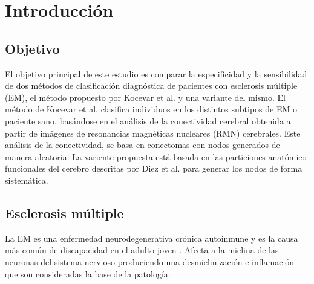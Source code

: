 \documentclass[fleqn,10pt]{UICArticle} %
\affiliation{\textsuperscript{1}\textit{Facultad de Medicina, Universitat Internacional de Catalunya, Barcelona, Spain}}
\affiliation{*\textbf{Datos de contacto}: gabriel.mp@uic.es} %
\begin{document}
\flushbottom 

\maketitle

\tableofcontents

\thispagestyle{empty} 


\section{Introducción}

\subsection{Objetivo}

El objetivo principal de este estudio es comparar la especificidad y la sensibilidad de dos métodos de clasificación diagnóstica de pacientes con esclerosis múltiple (EM), el método propuesto por Kocevar et al.\cite{Kocevar2016} y una variante del mismo. El método de Kocevar et al.\cite{Kocevar2016} clasifica individuos en los distintos subtipos de EM o paciente sano, basándose en el análisis de la conectividad cerebral obtenida a partir de imágenes de  resonancias magnéticas nucleares (RMN) cerebrales. Este análisis de la conectividad, se basa en conectomas con nodos generados de manera aleatoria. La variente propuesta está basada en las particiones anatómico-funcionales del cerebro descritas por Diez et al.\cite{Diez2015} para generar los nodos de forma sistemática.


\subsection{Esclerosis múltiple}

La EM es una enfermedad neurodegenerativa crónica autoinmune y es la causa más común de discapacidad en el adulto joven \cite{Polman2011}. Afecta a la mielina de las neuronas del sistema nervioso produciendo una desmielinización e inflamación que son consideradas la base de la patología.
\end{document}
